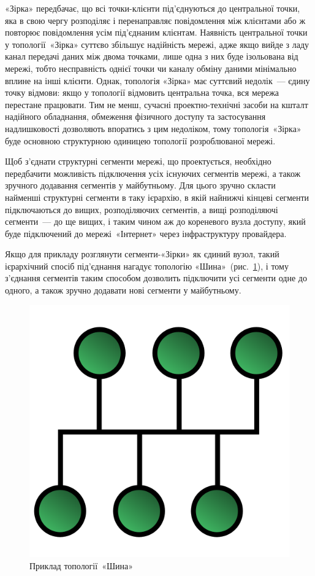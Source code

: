 \documentclass[
  ukrainian,
  simple,
  floatsection,
]{eskdnaukvd}
\newlength{\gridunitwidth}
\begin{document}
      «Зірка» передбачає, що всі точки-клієнти під'єднуються до центральної точки, яка в свою чергу розподіляє і перенаправляє повідомлення між клієнтами або ж повторює повідомлення усім під'єднаним клієнтам. Наявність центральної точки у топології~«Зірка» суттєво збільшує надійність мережі, адже якщо вийде з ладу канал передачі даних між двома точками, лише одна з них буде ізольована від мережі, тобто несправність однієї точки чи каналу обміну даними мінімально вплине на інші клієнти. Однак, топологія «Зірка» має суттєвий недолік~— єдину точку відмови: якщо у топології відмовить центральна точка, вся мережа перестане працювати. Тим не менш, сучасні проектно-технічні засоби на кшталт надійного обладнання, обмеження фізичного доступу та застосування надлишковості дозволяють впоратись з цим недоліком, тому топологія~«Зірка» буде основною структурною одиницею топології розроблюваної мережі.

      Щоб з'єднати структурні сегменти мережі, що проектується, необхідно передбачити можливість підключення усіх існуючих сегментів мережі, а також зручного додавання сегментів у майбутньому. Для цього зручно скласти найменші структурні сегменти в таку ієрархію, в якій найнижчі кінцеві сегменти підключаються до вищих, розподіляючих сегментів, а вищі розподіляючі сегменти~— до ще вищих, і таким чином аж до кореневого вузла доступу, який буде підключений до мережі «Інтернет» через інфраструктуру провайдера.

      Якщо для прикладу розглянути сегменти-«Зірки» як єдиний вузол, такий ієрархічний спосіб під'єднання нагадує топологію «Шина»~(рис.~\ref{fig:topology-bus}), і тому з'єднання сегментів таким способом дозволить підключити усі сегменти одне до одного, а також зручно додавати нові сегменти у майбутньому.

      \begin{figure}[!htbp]
        \centering
        \includegraphics[width = 4 \gridunitwidth]{./assets/03-topology-bus.png}
        \caption{Приклад топології~«Шина»}
        \label{fig:topology-bus}
      \end{figure}
\end{document}
